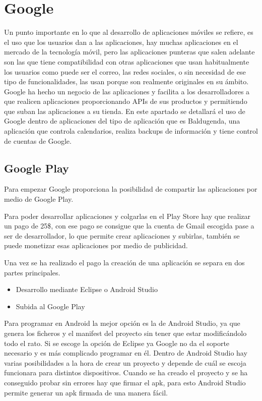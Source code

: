\section{Google}
\label{secc:google}

Un punto importante en lo que al desarrollo de aplicaciones móviles se refiere, es el uso que los usuarios dan a las aplicaciones, hay muchas aplicaciones en el mercado de la tecnología móvil, pero las aplicaciones punteras que salen adelante son las que tiene compatibilidad con otras aplicaciones que usan habitualmente los usuarios como puede ser el correo, las redes sociales, o sin necesidad de ese tipo de funcionalidades, las usan porque son realmente originales en su ámbito.
Google ha hecho un negocio de las aplicaciones y facilita a los desarrolladores a que  realicen aplicaciones proporcionando APIs de sus productos y permitiendo que suban las aplicaciones a su tienda.
En este apartado se detallará el uso de Google dentro de aplicaciones del tipo de aplicación que es Baldugenda, una aplicación que controla calendarios, realiza backups de información  y tiene control de cuentas de Google.

\subsection{Google Play}
\label{subsecc:Google Play}

Para empezar Google proporciona la posibilidad de compartir  las aplicaciones por medio de Google Play.

Para poder desarrollar aplicaciones y colgarlas en el Play Store hay que realizar un pago de 25\$, con ese pago se consigue que la cuenta de Gmail escogida pase a ser de desarrollador, lo que permite crear aplicaciones y subirlas, también se puede monetizar esas aplicaciones por medio de publicidad.

Una vez se ha realizado el pago la creación de una aplicación se separa en dos partes principales.

\begin{itemize}
\item Desarrollo mediante Eclipse o \gls{Android Studio}
\item Subida al Google Play
\end{itemize}

Para programar en Android la mejor opción es la de Android Studio, ya que genera los ficheros y el manifest del proyecto sin tener que estar modificándolo todo el rato.
Si se escoge la opción de Eclipse ya Google no da el soporte necesario y es más complicado programar en él.
Dentro de Android Studio hay varias posibilidades a la hora de crear un proyecto y depende de cuál se escoja funcionara para distintos dispositivos.
Cuando se ha creado el proyecto y se ha conseguido probar sin errores hay que firmar el apk, para esto Android Studio permite generar un apk firmada de una manera fácil.

